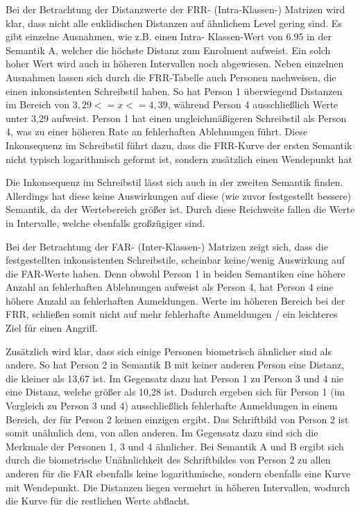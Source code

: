 \documentclass{article}
\begin{document}
Bei der Betrachtung der Distanzwerte der FRR- (Intra-Klassen-) Matrizen wird klar, dass nicht alle 
euklidischen Distanzen auf ähnlichem Level gering sind. Es gibt einzelne Ausnahmen, wie z.B. einen Intra-
Klassen-Wert von 6.95 in der Semantik A, welcher die höchste Distanz zum Enrolment aufweist. Ein solch 
hoher Wert wird auch in höheren Intervallen noch abgewiesen. Neben einzelnen Ausnahmen lassen sich durch 
die FRR-Tabelle auch Personen nachweisen, die einen inkonsistenten Schreibstil haben. So hat Person 1 
überwiegend Distanzen im Bereich von $3,29 <= x <= 4,39$, während Person 4 ausschließlich Werte unter 3,29 
aufweist. Person 1 hat einen ungleichmäßigeren Schreibstil als Person 4, was zu einer höheren Rate an 
fehlerhaften Ablehnungen führt. Diese Inkonsequenz im Schreibstil führt dazu, dass die FRR-Kurve der 
ersten Semantik nicht typisch logarithmisch geformt ist, sondern zusätzlich einen Wendepunkt hat

Die Inkonsequenz im Schreibstil lässt sich auch in der zweiten Semantik finden. Allerdings hat diese keine 
Auswirkungen auf diese (wie zuvor festgestellt bessere) Semantik, da der Wertebereich größer ist. Durch 
diese Reichweite fallen die Werte in Intervalle, welche ebenfalls großzügiger sind.

Bei der Betrachtung der FAR- (Inter-Klassen-) Matrizen zeigt sich, dass die festgestellten inkonsistenten 
Schreibstile, scheinbar keine/wenig Auswirkung auf die FAR-Werte haben. Denn obwohl Person 1 in beiden 
Semantiken eine höhere Anzahl an fehlerhaften Ablehnungen aufweist als Person 4, hat Person 4 eine höhere 
Anzahl an fehlerhaften Anmeldungen. Werte im höheren Bereich bei der FRR, schließen somit nicht auf mehr 
fehlerhafte Anmeldungen / ein leichteres Ziel für einen Angriff.

Zusätzlich wird klar, dass sich einige Personen biometrisch ähnlicher sind als andere. So hat Person 2 in 
Semantik B mit keiner anderen Person eine Distanz, die kleiner als 13,67 ist. Im Gegensatz dazu hat Person 
1 zu Person 3 und 4 nie eine Distanz, welche größer als 10,28 ist. Dadurch ergeben sich für Person 1 (im 
Vergleich zu Person 3 und 4) ausschließlich fehlerhafte Anmeldungen in einem Bereich, der für Person 2 
keinen einzigen ergibt. Das Schriftbild von Person 2 ist somit unähnlich dem, von allen anderen. Im 
Gegensatz dazu sind sich die Merkmale der Personen 1, 3 und 4 ähnlicher. Bei Semantik A und B ergibt sich 
durch die biometrische Unähnlichkeit des Schriftbildes von Person 2 zu allen anderen für die FAR ebenfalls 
keine logarithmische, sondern ebenfalls eine Kurve mit Wendepunkt. Die Distanzen liegen vermehrt in 
höheren Intervallen, wodurch die Kurve für die restlichen Werte abflacht. 
\end{document}
